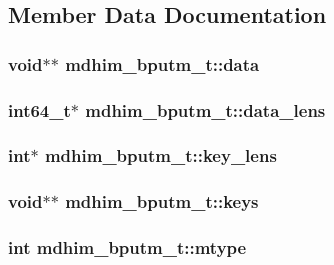 \subsection{Member Data Documentation}
\hypertarget{structmdhim__bputm__t_aeca654729127b0dfdaaee05ede56fabe}{
\subsubsection[{data}]{\setlength{\rightskip}{0pt plus 5cm}void$\ast$$\ast$ mdhim\-\_\-bputm\-\_\-t\-::data}}\label{d1/ddf/structmdhim__bputm__t_aeca654729127b0dfdaaee05ede56fabe}
\hypertarget{structmdhim__bputm__t_a98c305f7412151649471b47fbc731018}{
\subsubsection[{data\-\_\-lens}]{\setlength{\rightskip}{0pt plus 5cm}int64\-\_\-t$\ast$ mdhim\-\_\-bputm\-\_\-t\-::data\-\_\-lens}}\label{d1/ddf/structmdhim__bputm__t_a98c305f7412151649471b47fbc731018}
\hypertarget{structmdhim__bputm__t_a528ae69dc41eab9b8e8d523d67debeac}{
\subsubsection[{key\-\_\-lens}]{\setlength{\rightskip}{0pt plus 5cm}int$\ast$ mdhim\-\_\-bputm\-\_\-t\-::key\-\_\-lens}}\label{d1/ddf/structmdhim__bputm__t_a528ae69dc41eab9b8e8d523d67debeac}
\hypertarget{structmdhim__bputm__t_a6cd17a8565bb662fdb1d52d878ce2a3d}{
\subsubsection[{keys}]{\setlength{\rightskip}{0pt plus 5cm}void$\ast$$\ast$ mdhim\-\_\-bputm\-\_\-t\-::keys}}\label{d1/ddf/structmdhim__bputm__t_a6cd17a8565bb662fdb1d52d878ce2a3d}
\hypertarget{structmdhim__bputm__t_a84865663becc6cfd06c5c7667b37244d}{
\subsubsection[{mtype}]{\setlength{\rightskip}{0pt plus 5cm}int mdhim\-\_\-bputm\-\_\-t\-::mtype}}\label{d1/ddf/structmdhim__bputm__t_a84865663becc6cfd06c5c7667b37244d}
